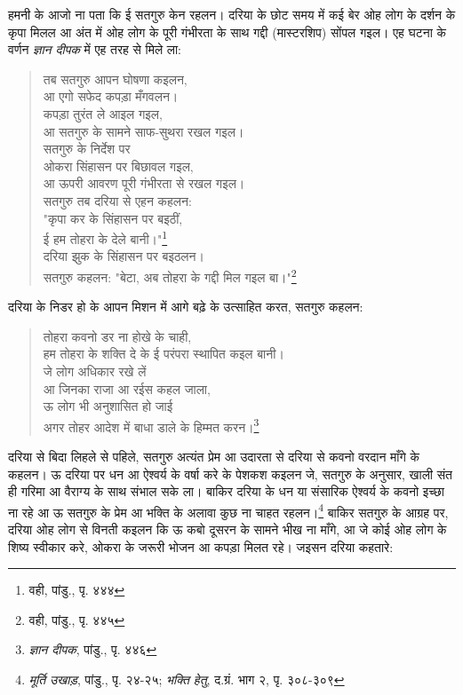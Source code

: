 हमनी के आजो ना पता कि ई सतगुरु केन रहलन। दरिया के छोट समय में कई बेर ओह लोग के दर्शन के कृपा मिलल आ अंत में ओह लोग के पूरी गंभीरता के साथ गद्दी (मास्टरशिप) सोंपल गइल। एह घटना के वर्णन \textit{ज्ञान दीपक} में एह तरह से मिले ला:

\begin{quote}
तब सतगुरु आपन घोषणा कइलन, \\
आ एगो सफेद कपड़ा मँगवलन। \\
कपड़ा तुरंत ले आइल गइल, \\
आ सतगुरु के सामने साफ-सुथरा रखल गइल। \\
सतगुरु के निर्देश पर \\
ओकरा सिंहासन पर बिछावल गइल, \\
आ ऊपरी आवरण पूरी गंभीरता से रखल गइल। \\
सतगुरु तब दरिया से एहन कहलन: \\
"कृपा कर के सिंहासन पर बइठीं, \\
ई हम तोहरा के देले बानी।"\footnote{वही, पांडु., पृ. ४४४} \\
दरिया झुक के सिंहासन पर बइठलन। \\
सतगुरु कहलन: "बेटा, अब तोहरा के गद्दी मिल गइल बा।"\footnote{वही, पांडु., पृ. ४४५}
\end{quote}

दरिया के निडर हो के आपन मिशन में आगे बढ़े के उत्साहित करत, सतगुरु कहलन:

\begin{quote}
तोहरा कवनो डर ना होखे के चाही, \\
हम तोहरा के शक्ति दे के ई परंपरा स्थापित कइल बानी। \\
जे लोग अधिकार रखे लें \\
आ जिनका राजा आ रईस कहल जाला, \\
ऊ लोग भी अनुशासित हो जाई \\
अगर तोहर आदेश में बाधा डाले के हिम्मत करन।\footnote{\textit{ज्ञान दीपक}, पांडु., पृ. ४४६}
\end{quote}

दरिया से बिदा लिहले से पहिले, सतगुरु अत्यंत प्रेम आ उदारता से दरिया से कवनो वरदान माँगे के कहलन। ऊ दरिया पर धन आ ऐश्वर्य के वर्षा करे के पेशकश कइलन जे, सतगुरु के अनुसार, खाली संत ही गरिमा आ वैराग्य के साथ संभाल सके ला। बाकिर दरिया के धन या संसारिक ऐश्वर्य के कवनो इच्छा ना रहे आ ऊ सतगुरु के प्रेम आ भक्ति के अलावा कुछ ना चाहत रहलन।\footnote{\textit{मूर्ति उखाड़}, पांडु., पृ. २४-२५; \textit{भक्ति हेतु}, द.ग्रं. भाग २, पृ. ३०८-३०९} बाकिर सतगुरु के आग्रह पर, दरिया ओह लोग से विनती कइलन कि ऊ कबो दूसरन के सामने भीख ना माँगे, आ जे कोई ओह लोग के शिष्य स्वीकार करे, ओकरा के जरूरी भोजन आ कपड़ा मिलत रहे। जइसन दरिया कहतारे:

